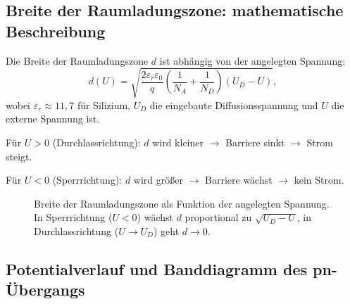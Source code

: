 ﻿\documentclass[12pt, a4paper]{article}
\begin{document}
	\subsection{Breite der Raumladungszone: mathematische Beschreibung}
	
	Die Breite der Raumladungszone $d$ ist abhängig von der angelegten Spannung:
	\begin{equation}
		d(U) = \sqrt{\frac{2\varepsilon_r \varepsilon_0}{q} \left(\frac{1}{N_A} +
			\frac{1}{N_D}\right)(U_D - U)},
		\label{eq:rlz_breite}
	\end{equation}
	wobei $\varepsilon_r \approx 11{,}7$ für Silizium, $U_D$ die eingebaute
	Diffusionsspannung und $U$ die externe Spannung ist.
	
	Für $U > 0$ (Durchlassrichtung): $d$ wird kleiner $\to$ Barriere sinkt $\to$
	Strom steigt.
	
	Für $U < 0$ (Sperrrichtung): $d$ wird größer $\to$ Barriere wächst $\to$
	kein Strom.
	
	\begin{figure}[h]
		\centering
		\caption{Breite der Raumladungszone als Funktion der angelegten Spannung. In
			Sperrrichtung ($U < 0$) wächst $d$ proportional zu $\sqrt{U_D - U}$, in
			Durchlassrichtung ($U \to U_D$) geht $d \to 0$.}
		\label{fig:rlz_breite}
	\end{figure}
	
	\subsection{Potentialverlauf und Banddiagramm des pn-Übergangs}
	
\end{document}
